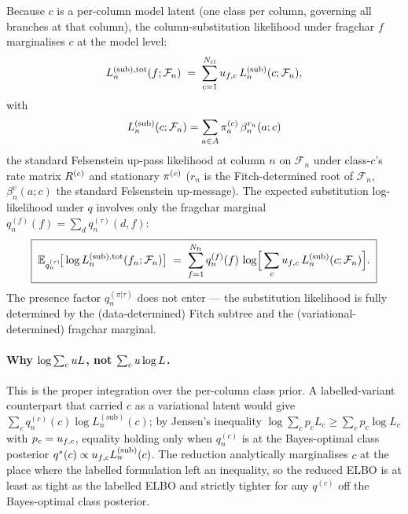 Because $c$ is a per-column model latent (one class per column,
governing all branches at that column), the column-substitution
likelihood under fragchar $f$ marginalises $c$ at the model level:
\begin{equation}
\label{eq:L-sub-total}
L^{(\text{sub}), \text{tot}}_n(f; \mathcal{F}_n)
\;=\; \sum_{c=1}^{N_{\text{cl}}} u_{f, c}\,
       L^{(\text{sub})}_n(c; \mathcal{F}_n),
\end{equation}
with
\begin{equation}
\label{eq:L-sub-mixdom}
L^{(\text{sub})}_n(c; \mathcal{F}_n)
= \sum_{a \in A} \pi^{(c)}_a\,\beta_n^{r_n}(a; c)
\end{equation}
the standard Felsenstein up-pass likelihood at column $n$ on
$\mathcal{F}_n$ under class-$c$'s rate matrix $R^{(c)}$ and
stationary $\pi^{(c)}$ ($r_n$ is the Fitch-determined root of
$\mathcal{F}_n$, $\beta_n^v(a; c)$ the standard Felsenstein
up-message). The expected substitution
log-likelihood under $q$ involves only the fragchar marginal
$q_n^{(f)}(f) = \sum_d q_n^{(\tau)}(d, f)$:
\begin{equation}
\label{eq:E-sub-mixdom-reduced}
\boxed{\;
\mathbb{E}_{q_n^{(\tau)}}\!\big[\log L^{(\text{sub}), \text{tot}}_n(f_n; \mathcal{F}_n)\big]
\;=\; \sum_{f=1}^{N_{\text{fr}}} q_n^{(f)}(f)\,
      \log\!\Big[\sum_c u_{f, c}\,
                  L^{(\text{sub})}_n(c; \mathcal{F}_n)\Big].
\;}
\end{equation}
The presence factor $q_n^{(\pi|\tau)}$ does not enter — the
substitution likelihood is fully determined by the (data-determined)
Fitch subtree and the (variational-determined) fragchar marginal.

\paragraph{Why $\log\sum_c u L$, not $\sum_c u \log L$.}
This is the proper integration over the per-column class prior. A
labelled-variant counterpart that carried $c$ as a variational latent
would give $\sum_c q^{(c)}_n(c) \log L^{(\text{sub})}_n(c)$; by Jensen's inequality
$\log \sum_c p_c L_c \geq \sum_c p_c \log L_c$ with $p_c =
u_{f, c}$, equality holding only when
$q^{(c)}_n$ is at the Bayes-optimal class posterior
$q^*(c) \propto u_{f, c} L^{(\text{sub})}_n(c)$.
The reduction analytically marginalises $c$ at the place where the
labelled formulation left an inequality, so the reduced ELBO is at
least as tight as the labelled ELBO and strictly tighter for any
$q^{(c)}$ off the Bayes-optimal class posterior.

